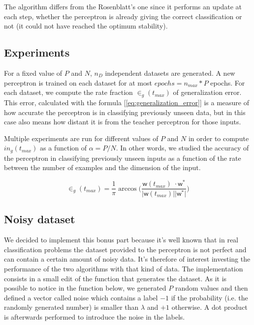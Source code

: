 The algorithm differs from the Rosenblatt's one since it performs an update at each step, whether the perceptron is already giving the correct classification or not (it could not have reached the optimum stability).

\subsection{Experiments}
For a fixed value of $P$ and $N$, $n_D$ independent datasets are generated. A new perceptron is trained on each dataset for at most $epochs = n_{max} * P$ epochs.
For each dataset, we compute the rate fraction $\in_g(t_{max})$ of generalization error. This error, calculated with the formula [\ref{eq:generalization_error}]
is a measure of how accurate the perceptron is in classifying previously unseen data, but in this case also means how distant it is from the teacher perceptron for those inputs.

Multiple experiments are run for different values of $P$ and $N$ in order to compute $in_g(t_{max})$ as a function of $\alpha = P / N$.
In other words, we studied the accuracy of the perceptron in classifying previously unseen inputs as a function of the rate between the number of examples and the dimension of the input.

\begin{equation} \label{eq:generalization_error}
    \in_g(t_{max}) = \frac{1}{\pi} \arccos \bigg(\frac{\bm{\mathsf{w}}(t_{max})\;\cdotp \bm{\mathsf{w}}^*}{\lvert \bm{\mathsf{w}}(t_{max}) \rvert \lvert \bm{\mathsf{w}}^* \rvert} \bigg)
\end{equation}

\subsection{Noisy dataset}
We decided to implement this bonus part because it's well known that in real classification problems the dataset provided to the perceptron is not perfect and can contain a certain
amount of noisy data. It's therefore of interest investing the performance of the two algorithms with that kind of data. The implementation consists in a small edit of the function
that generates the dataset. As it is possible to notice in the function below, we generated $P$ random values and then defined a vector called noise which contains
a label $-1$ if the probability (i.e. the randomly generated number) is smaller than $\lambda$ and $+1$ otherwise. A dot product is afterwards performed to introduce the noise in
the labels.